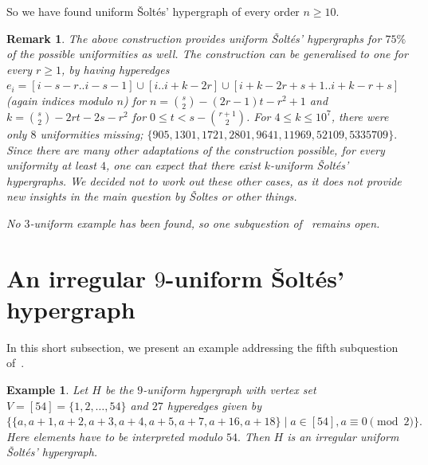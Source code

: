 \documentclass[a4paper,11pt]{article}
\newtheorem{exam}[defi]{Example}
\newtheorem{remark}[defi]{Remark}
\begin{document}
    So we have found uniform \v Solt\'es' hypergraph of every order $n \ge 10.$

    \begin{remark}
        The above construction provides uniform \v Solt\'es' hypergraphs for $75\%$ of the possible uniformities as well.
        The construction can be generalised to one for every $r \ge 1$, by having hyperedges $e_i=[i-s-r..i-s-1] \cup [i..i+k-2r]\cup[i+k-2r+s+1..i+k-r+s]$ (again indices modulo $n$) for $n=\binom{s}{2}-(2r-1)t-r^2+1$ and $k=\binom{s}{2}-2rt-2s-r^2$ for $0 \le t < s-\binom{r+1}{2}$. For $4 \le k \le 10^7$, there were only $8$ uniformities missing; $\{905, 1301, 1721, 2801, 9641, 11969, 52109, 5335709\}.$ 
        Since there are many other adaptations of the construction possible, for every uniformity at least $4$, one can expect that there exist $k$-uniform \v Solt\'es' hypergraphs. 
        We decided not to work out these other cases, as it does not provide new insights in the main question by \v Soltes or other things.        
        
        
        No $3$-uniform example has been found, so one subquestion of~\cite[Ques.~13]{Cambie24Hyper} remains open.
    \end{remark}



\section{An irregular $9$-uniform \v Solt\'es' hypergraph}\label{sec:irregular}

In this short subsection, we present an example addressing the fifth subquestion of~\cite[Ques.~13]{Cambie24Hyper}.

\begin{exam}
Let $H$ be the $9$-uniform hypergraph with vertex set $V=[54]=\{1,2,\ldots,54\}$
and $27$ hyperedges given by
$\{ \{a,a+1,a+2,a+3,a+4,a+5,a+7,a+16,a+18\} \mid a \in [54], a \equiv 0 \pmod 2\}.$
Here elements have to be interpreted modulo $54.$
Then $H$ is an irregular uniform \v Solt\'es' hypergraph.
\end{exam}
\end{document}
